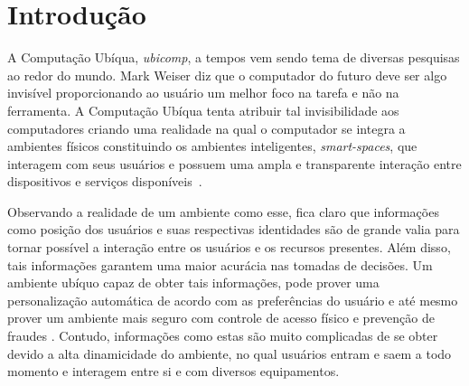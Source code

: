 
\chapter{Introdução}
	
A Computação Ubíqua, \textit{ubicomp}, a tempos vem sendo tema de diversas pesquisas ao redor do mundo. Mark Weiser diz que o computador do futuro deve ser algo invisível proporcionando ao usuário um melhor foco na tarefa e não na ferramenta. A Computação Ubíqua tenta atribuir tal invisibilidade aos computadores criando uma realidade na qual o computador se integra a ambientes físicos constituindo os ambientes inteligentes, \textit{smart-spaces}, que interagem com seus usuários e possuem uma ampla e transparente interação entre dispositivos e serviços disponíveis~\cite{fabriciobuzzeto,alegomes,weiser1, weiser2}.

Observando a realidade de um ambiente como esse, fica claro que informações como posição dos usuários e suas respectivas identidades são de grande valia para tornar possível a interação entre os usuários e os recursos presentes. Além disso, tais informações garantem uma maior acurácia nas tomadas de decisões. Um ambiente ubíquo capaz de obter tais informações, pode prover uma personalização automática de acordo com as preferências do usuário e até mesmo prover um ambiente mais seguro com controle de acesso físico e prevenção de fraudes \cite{saocarlos}. Contudo, informações como estas são muito complicadas de se obter devido a alta dinamicidade do ambiente, no qual usuários entram e saem a todo momento e interagem entre si e com diversos equipamentos.






